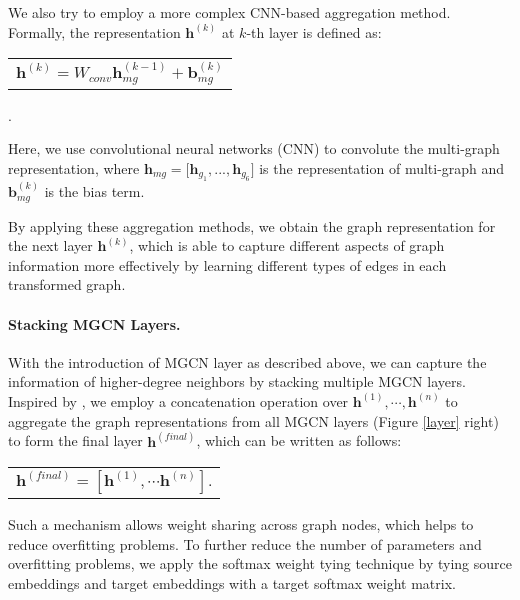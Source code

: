 \documentclass[11pt,a4paper]{article}
\renewcommand{\vec}[1]{\mathbf{#1}} \usepackage{color, colortbl}
\renewcommand{\vec}[1]{\mathbf{#1}}
\begin{document}
We also try to employ a more complex CNN-based aggregation method. Formally, the representation $\vec{h}^{(k)}$ at $k$-th layer is defined as:
\begin{center}
\begin{tabular}{c}
		$
		\vec{h}^{(k)} =
		W_{conv}
		\vec{h}_{mg}^{(k-1)}
+
        \vec{b}_{mg}^{(k)}
		$
	\end{tabular}.
\end{center}

Here, we use convolutional neural networks (CNN) to convolute the multi-graph representation, where $\vec{h}_{mg} = \lbrack \vec{h}_{g_{1}}, ..., \vec{h}_{g_{6}} \rbrack$ is the representation of multi-graph and $\vec{b}_{mg}^{(k)}$ is the bias term.

By applying these aggregation methods, we obtain the graph representation for the next layer $\vec{h}^{(k)}$, which is able to capture different aspects of graph information more effectively by learning different types of edges in each transformed graph.

\paragraph{Stacking MGCN Layers.}
With the introduction of MGCN layer as described above, we can capture the information of higher-degree neighbors by stacking multiple MGCN layers.
Inspired by \citet{xu2018representation}, we employ a concatenation operation over $\vec{h}^{(1)}, \cdots, \vec{h}^{(n)}$ to aggregate the graph representations from all MGCN layers (Figure \ref{layer} right) to form the final layer $\vec{h}^{(final)}$, which can be written as follows:
\begin{center}
\begin{tabular}{c}
		$
		\vec{h}^{(final)} =
		\left [
		\vec{h}^{(1)}, 
		\cdots 
		\vec{h}^{(n)}
		\right ].
        $
	\end{tabular}
\end{center}


Such a mechanism allows weight sharing across graph nodes, which helps to reduce overfitting problems.
To further reduce the number of parameters and overfitting problems, we apply the softmax weight tying technique \cite{press2017using} by tying source embeddings and target embeddings with a target softmax weight matrix.
\end{document}
